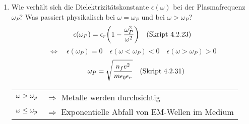 \begin{enumerate}
  \item Wie verhält sich die Dielektrizitätskonstante $\epsilon(\omega)$ %
        bei der Plasmafrequenz $\omega_P$? Was passiert physikalisch bei
        $\omega=\omega_P$ und bei $\omega>\omega_P$?
        $$
        \epsilon(\omega_P)=\epsilon_r\qty(1-\frac{\omega_P^2}{\omega^2})
        \quad\text{(Skript 4.2.23)}$$
        $$\Leftrightarrow\quad\epsilon(\omega_P)=0
        \quad\epsilon(\omega<\omega_P)<0 
        \quad\epsilon(\omega>\omega_P)>0$$
        $$\quad\omega_P=\sqrt{\frac{n_fe^2}
        {m\epsilon_0\epsilon_r}}\quad\text{(Skript 4.2.31)}$$
        \begin{tabular}{rl}
          $\displaystyle\omega>\omega_p$ &$\Rightarrow$ 
          Metalle werden durchsichtig\\
          $\displaystyle\omega\le\omega_p$& $\Rightarrow$ Exponentielle 
          Abfall von EM-Wellen im Medium
        \end{tabular}
        \begin{center}
        \end{center}

\end{enumerate}

